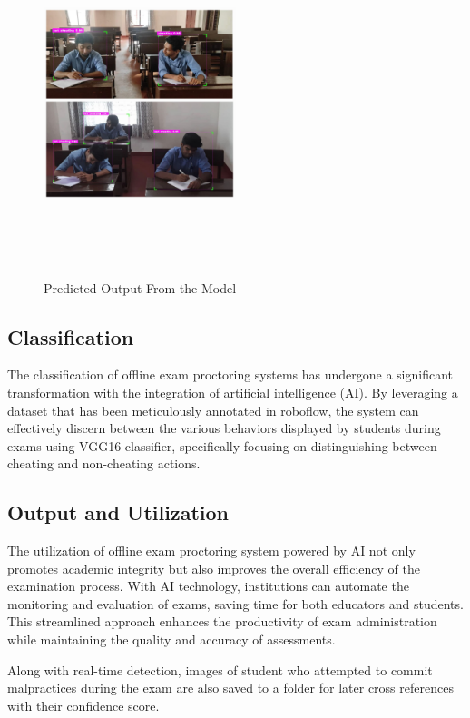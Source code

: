 \documentclass[conference]{IEEEtran}
\begin{document}
\begin{figure}[htbp]
\centering
\includegraphics[width=0.5\textwidth, height=10cm]{images/detection.jpeg}  %
\caption{Predicted Output From the Model}
\label{fig}
\end{figure}


\subsection{Classification}
The classification of offline exam proctoring systems has undergone a significant transformation with the integration of artificial intelligence (AI). By leveraging a dataset that has been meticulously annotated in roboflow, the system can effectively discern between the various behaviors displayed by students during exams using VGG16 classifier, specifically focusing on distinguishing between cheating and non-cheating actions.

\subsection{Output and Utilization}
 The utilization of offline exam proctoring system powered by AI not only promotes academic integrity but also improves the overall efficiency of the examination process. With AI technology, institutions can automate the monitoring and evaluation of exams, saving time for both educators and students. This streamlined approach enhances the productivity of exam administration while maintaining the quality and accuracy of assessments.

 Along with real-time detection, images of student who attempted to commit malpractices during the exam are also saved to a folder for later cross references with their confidence score.
\end{document}
